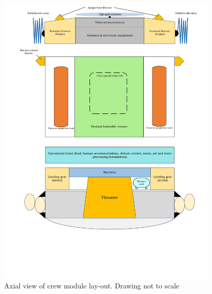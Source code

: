 \begin{figure}[h]
		\centering
		\includegraphics[width=0.95\textwidth]{./Figure/CrewModule/Axialview.pdf}
		\caption[Axial view of crew module lay-out]{Axial view of crew module lay-out. Drawing not to scale}
		\label{fig:axview}
\end{figure}

